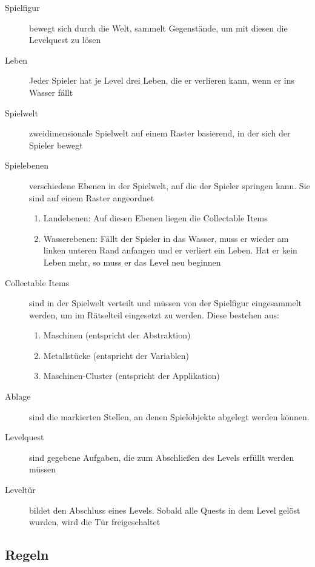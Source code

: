 \documentclass{scrartcl}
\begin{document}
\begin{description}
	\item[Spielfigur] bewegt sich durch die Welt, sammelt Gegenstände, um mit diesen die Levelquest zu lösen
	\item[Leben] Jeder Spieler hat je Level drei Leben, die er verlieren kann, wenn er ins Wasser fällt
	\item[Spielwelt] zweidimensionale Spielwelt auf einem Raster basierend, in der sich der Spieler bewegt
	\item[Spielebenen] verschiedene Ebenen in der Spielwelt, auf die der Spieler springen kann. Sie sind auf einem Raster angeordnet
		\begin{enumerate}[label=\arabic*]
			\item Landebenen: Auf diesen Ebenen liegen die Collectable Items
			\item Wasserebenen: Fällt der Spieler in das Wasser, muss er wieder am linken unteren Rand anfangen und er verliert ein Leben. Hat er kein Leben mehr, so muss er das Level neu beginnen
		\end{enumerate}
	\item[Collectable Items] \label{elemente:collectable}sind in der Spielwelt verteilt und müssen von der Spielfigur eingesammelt werden, um im Rätselteil eingesetzt zu werden. Diese bestehen aus:
	\begin{enumerate}[label=\arabic*]
		\item Maschinen (entspricht der Abstraktion)
		\item Metallstücke (entspricht der Variablen)
		\item Maschinen-Cluster (entspricht der Applikation)
	\end{enumerate}
	\item[Ablage] sind die markierten Stellen, an denen Spielobjekte abgelegt werden können.
	\item[Levelquest] sind gegebene Aufgaben, die zum Abschließen des Levels erfüllt werden müssen
	\item[Leveltür] bildet den Abschluss eines Levels. Sobald alle Quests in dem Level gelöst wurden, wird die Tür freigeschaltet
\end{description}

\subsection{Regeln}
\end{document}
